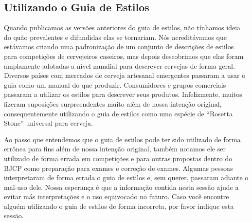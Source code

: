 \subsection*{Utilizando o Guia de Estilos}
Quando publicamos as versões anteriores do guia de estilos, não tínhamos ideia do quão prevalentes e difundidas elas se tornariam. Nós acreditávamos que estávamos criando uma padronização de um conjunto de descrições de estilos para competições de cervejeiros caseiros, mas depois descobrimos que elas foram amplamente adotadas a nível mundial para descrever cervejas de forma geral. Diversos países com mercados de cerveja artesanal emergentes passaram a usar o guia como um manual do que produzir. Consumidores e grupos comerciais passaram a utilizar os estilos para descrever seus produtos. Infelizmente, muitos fizeram suposições surpreendentes muito além de nossa intenção original, consequentemente utilizando o guia de estilos como uma espécie de “Rosetta Stone” universal para cerveja.

Ao passo que entendemos que o guia de estilos pode ter sido utilizado de forma errônea para fins além de nossa intenção original, também notamos ele ser utilizado de forma errada em competições e para outras propostas dentro do BJCP como preparação para exames e correção de exames. Algumas pessoas interpretaram de forma errada o guia de estilos e, sem querer, passaram adiante o mal-uso dele. Nossa esperança é que a informação contida nesta sessão ajude a evitar más interpretações e o uso equivocado no futuro. Caso você encontre alguém utilizando o guia de estilos de forma incorreta, por favor indique esta sessão.

